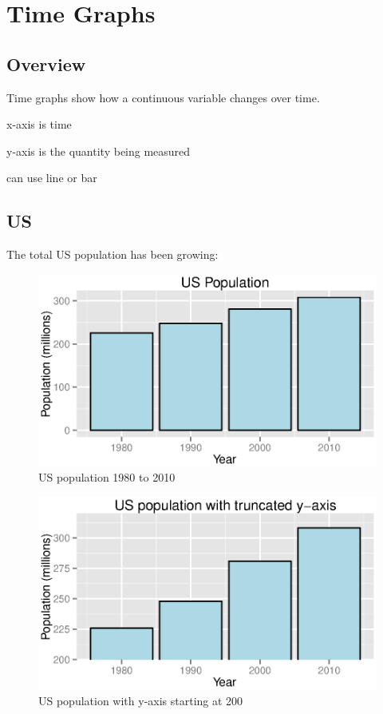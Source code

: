 \documentclass{exam}
\begin{document}
  \section{Time Graphs}

  \subsection{Overview}

  Time graphs show how a continuous variable changes over time.  

  \begin{itemize*}
    \item x-axis is time
    \item y-axis is the quantity being measured
    \item can use line or bar
  \end{itemize*}

  \subsection{US}
  The total US population has been growing:
  \begin{figure}[H]
    \centering
    \includegraphics[scale = 0.9]{figures/us_population.eps}
    \caption{US population 1980 to 2010}
  \end{figure}

  \begin{figure}[H]
    \centering
    \includegraphics[scale = 0.9]{figures/us_population_limited_range.eps}
    \caption{US population with y-axis starting at 200}
  \end{figure}
\end{document}
